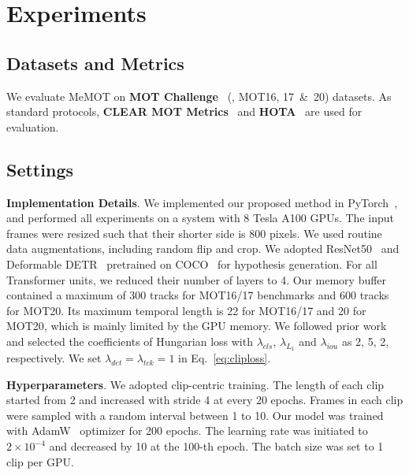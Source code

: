 \section{Experiments}
\label{sec:exp}



\subsection{Datasets and Metrics} 
\label{sec:exp:datasets}

We evaluate MeMOT on \textbf{MOT Challenge}~\cite{milan2016mot16,dendorfer2020mot20} (\ie, MOT16, 17~\&~20) datasets.
As standard protocols, \textbf{CLEAR MOT Metrics}~\cite{milan2016mot16} and \textbf{HOTA}~\cite{luiten2021hota} are used for evaluation.

\subsection{Settings}
\label{sec:exp:settings}

\noindent \textbf{Implementation Details}.
We implemented our proposed method in PyTorch~\cite{paszke2019pytorch}, and performed all
experiments on a system with 8 Tesla A100 GPUs.
The input frames were resized such that their shorter side is 800 pixels.
We used routine data augmentations, including random flip and crop.
We adopted ResNet50~\cite{he2016deep} and Deformable DETR~\cite{zhu2020deformable} pretrained on COCO~\cite{lin2014microsoft} for hypothesis generation.
For all Transformer units, we reduced their number of layers to 4.
Our memory buffer contained a maximum of 300 tracks for MOT16/17 benchmarks and 600 tracks for MOT20. Its maximum temporal length is 22 for MOT16/17 and 20 for MOT20, which is mainly limited by the GPU memory.
We followed prior work~\cite{carion2020end,zhu2020deformable} and selected the coefficients of Hungarian loss with $\lambda_{cls}$, $\lambda_{L_1}$ and $\lambda_{iou}$ as 2, 5, 2, respectively.
We set $\lambda_{det}=\lambda_{tck}=1$ in Eq.~\ref{eq:cliploss}.

\vspace{3pt} \noindent \textbf{Hyperparameters}.
We adopted clip-centric training.
The length of each clip started from 2 and increased with stride 4 at every 20 epochs.
Frames in each clip were sampled with a random interval between 1 to 10.
Our model was trained with AdamW~\cite{loshchilov2017decoupled} optimizer for 200 epochs.
The learning rate was initiated to $2\times10^{-4}$ and decreased by 10 at the 100-th epoch.
The batch size was set to 1 clip per GPU.

